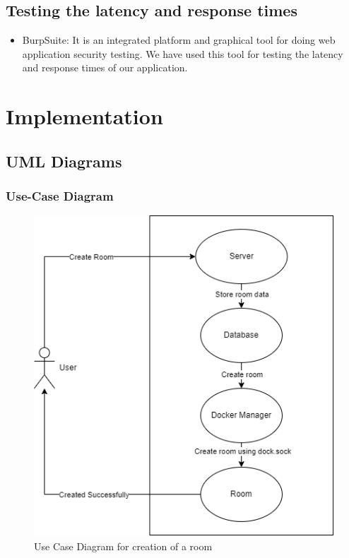 \documentclass[oneside,12pt]{Classes/VTU}
\begin{document}
			\subsection{Testing the latency and response times}
				\begin{itemize}
					\item BurpSuite: It is an integrated platform and graphical tool for doing web application security testing. We have used this tool for testing the latency and response times of our application. 
				\end{itemize}			
		
		\section{Implementation}
			
			\subsection{UML Diagrams}
				
				\subsubsection{Use-Case Diagram}
				
					\begin{figure}[H]
						\includegraphics[scale=0.45]{usecase1.png}
						\centering
						\caption{Use Case Diagram for creation of a room}
						\label{fig:uc1}
					\end{figure}
				
\end{document}
